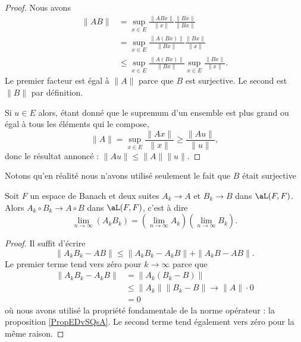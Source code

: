 \begin{proof}
    Nous avons
    \begin{subequations}
        \begin{align}
            \| AB \|&=\sup_{x\in E}\frac{ \| ABx \| }{ \| x \| }\frac{ \| Bx \| }{ \| Bx \| }\\
            &=\sup_{x\in E}\frac{ \| A(Bx) \| }{ \| Bx \| }\frac{ \| Bx \| }{ \| x \| }\\
            &\leq \sup_{x\in E}\frac{ \| A(Bx) \| }{ \| Bx \| }\sup_{x\in E}\frac{ \| Bx \| }{ \| x \| }.
        \end{align}
    \end{subequations}
    Le premier facteur est égal à \( \| A \|\) parce que \( B\) est surjective. Le second est \( \| B \|\) par définition.

    Si \( u\in E\) alors, étant donné que le supremum d'un ensemble est plus grand ou égal à tous les éléments qui le compose,
    \begin{equation}
        \| A \|=\sup_{x\in E}\frac{ \| Ax \| }{ \| x \| }\geq \frac{ \| Au \| }{ \| u \| },
    \end{equation}
    donc le résultat annoncé : \( \| Au \|\leq \| A \|\| u \|\).
\end{proof}
Notons qu'en réalité nous n'avons utilisé seulement le fait que \( B\) était surjective

\begin{lemma}   \label{LemWWXVSae}
Soit \( F\) un espace de Banach et deux suites \( A_k\to A\) et \( B_k\to B\) dans \( \aL(F,F)\). Alors \( A_k\circ B_k\to A\circ B\) dans \( \aL(F,F)\), c'est à dire
\begin{equation}
    \lim_{n\to \infty} (A_kB_k)=\left( \lim_{n\to \infty} A_k \right)\left( \lim_{n\to \infty} B_k \right).
\end{equation}
\end{lemma}

\begin{proof}
    Il suffit d'écrire
    \begin{equation}
        \| A_kB_k-AB \|\leq \| A_kB_k-A_kB \|+\| A_kB-AB \|.
    \end{equation}
    Le premier terme tend vers zéro pour \( k\to\infty\) parce que 
    \begin{subequations}
        \begin{align}
            \| A_kB_k-A_kB \|&=\| A_k(B_k-B) \|\\
            &\leq \| A_k \|\| B_k-B \|\to \| A \|\cdot 0\\
            &=0
        \end{align}
    \end{subequations}
    où nous avons utilisé la propriété fondamentale de la norme opérateur : la proposition \ref{PropEDvSQsA}. Le second terme tend également vers zéro pour la même raison.
\end{proof}

